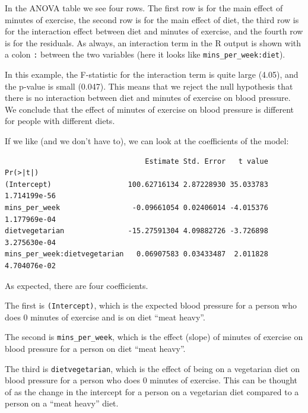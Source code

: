 \documentclass[
  letterpaper,
  8pt,
  a4paper]{book}
\newenvironment{Shaded}{\begin{snugshade}}{\end{snugshade}}
\newcommand{\FunctionTok}[1]{\textcolor[rgb]{0.28,0.35,0.67}{#1}}
\newcommand{\NormalTok}[1]{\textcolor[rgb]{0.00,0.23,0.31}{#1}}
\newcommand{\SpecialCharTok}[1]{\textcolor[rgb]{0.37,0.37,0.37}{#1}}
\begin{document}
In the ANOVA table we see four rows. The first row is for the main
effect of minutes of exercise, the second row is for the main effect of
diet, the third row is for the interaction effect between diet and
minutes of exercise, and the fourth row is for the residuals. As always,
an interaction term in the R output is shown with a colon \texttt{:}
between the two variables (here it looks like
\texttt{mins\_per\_week:diet}).

In this example, the F-statistic for the interaction term is quite large
(4.05), and the p-value is small (0.047). This means that we reject the
null hypothesis that there is no interaction between diet and minutes of
exercise on blood pressure. We conclude that the effect of minutes of
exercise on blood pressure is different for people with different diets.

If we like (and we don't have to), we can look at the coefficients of
the model:

\begin{Shaded}
\end{Shaded}

\begin{verbatim}
                                 Estimate Std. Error   t value     Pr(>|t|)
(Intercept)                  100.62716134 2.87228930 35.033783 1.714199e-56
mins_per_week                 -0.09661054 0.02406014 -4.015376 1.177969e-04
dietvegetarian               -15.27591304 4.09882726 -3.726898 3.275630e-04
mins_per_week:dietvegetarian   0.06907583 0.03433487  2.011828 4.704076e-02
\end{verbatim}

As expected, there are four coefficients.

The first is \texttt{(Intercept)}, which is the expected blood pressure
for a person who does 0 minutes of exercise and is on diet ``meat
heavy''.

The second is \texttt{mins\_per\_week}, which is the effect (slope) of
minutes of exercise on blood pressure for a person on diet ``meat
heavy''.

The third is \texttt{dietvegetarian}, which is the effect of being on a
vegetarian diet on blood pressure for a person who does 0 minutes of
exercise. This can be thought of as the change in the intercept for a
person on a vegetarian diet compared to a person on a ``meat heavy''
diet.
\end{document}
